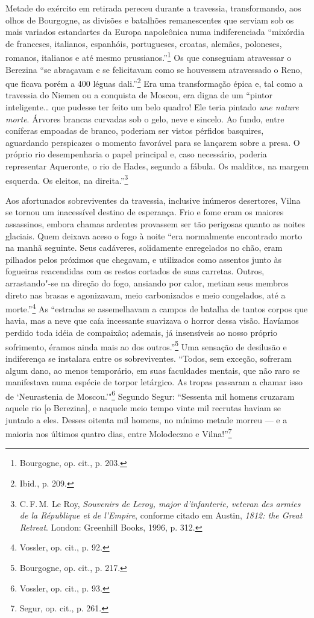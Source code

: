 Metade do exército em retirada pereceu durante a travessia,
transformando, aos olhos de Bourgogne, as divisões e batalhões
remanescentes que serviam sob os mais variados estandartes da Europa
napoleônica numa indiferenciada ``mixórdia de franceses, italianos,
espanhóis, portugueses, croatas, alemães, poloneses, romanos, italianos
e até mesmo prussianos.''\footnote{Bourgogne, op. cit., p. 203.} Os que
conseguiam atravessar o Berezina ``se abraçavam e se felicitavam como se
houvessem atravessado o Reno, que ficava porém a 400 léguas
dali.''\footnote{Ibid., p. 209.} Era uma transformação épica e, tal como
a travessia do Niemen ou a conquista de Moscou, era digna de um ``pintor
inteligente\ldots{} que pudesse ter feito um belo quadro! Ele teria
pintado \emph{une nature morte}. Árvores brancas curvadas sob o gelo,
neve e sincelo. Ao fundo, entre coníferas empoadas de branco, poderiam
ser vistos pérfidos basquires, aguardando perspicazes o momento
favorável para se lançarem sobre a presa. O próprio rio desempenharia o
papel principal e, caso necessário, poderia representar Aqueronte, o rio
de Hades, segundo a fábula. Os malditos, na margem esquerda. Os eleitos,
na direita.''\footnote{C.\,F.\,M. Le Roy, \emph{Souvenirs de Leroy, major
  d'infanterie, veteran des armies de la République et de l'Empire},
  conforme citado em Austin, \emph{1812: the Great Retreat}. London:
  Greenhill Books, 1996, p. 312.}

Aos afortunados sobreviventes da travessia, inclusive inúmeros
desertores, Vilna se tornou um inacessível destino de esperança. Frio e
fome eram os maiores assassinos, embora chamas ardentes provassem ser
tão perigosas quanto as noites glaciais. Quem deixava aceso o fogo à
noite ``era normalmente encontrado morto na manhã seguinte. Seus
cadáveres, solidamente enregelados no chão, eram pilhados pelos próximos
que chegavam, e utilizados como assentos junto às fogueiras reacendidas
com os restos cortados de suas carretas. Outros, arrastando"-se na
direção do fogo, ansiando por calor, metiam seus membros direto nas
brasas e agonizavam, meio carbonizados e meio congelados, até a
morte.''\footnote{Vossler, op. cit., p. 92.} As ``estradas se
assemelhavam a campos de batalha de tantos corpos que havia, mas a neve
que caía incessante suavizava o horror dessa visão. Havíamos perdido
toda idéia de compaixão; ademais, já insensíveis ao nosso próprio
sofrimento, éramos ainda mais ao dos outros.''\footnote{Bourgogne, op.
  cit., p. 217.} Uma sensação de desilusão e indiferença se instalara
entre os sobreviventes. ``Todos, sem exceção, sofreram algum dano, ao
menos temporário, em suas faculdades mentais, que não raro se
manifestava numa espécie de torpor letárgico. As tropas passaram a
chamar isso de `Neurastenia de Moscou.'"\footnote{Vossler, op. cit., p.
  93.} Segundo Segur: ``Sessenta mil homens cruzaram aquele rio {[}o
Berezina{]}, e naquele meio tempo vinte mil recrutas haviam se juntado a
eles. Desses oitenta mil homens, no mínimo metade morreu --- e a maioria
nos últimos quatro dias, entre Molodeczno e Vilna!''\footnote{Segur, op.
  cit., p. 261.}


